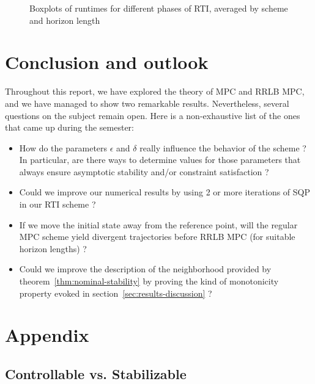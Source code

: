\documentclass[12pt]{article}
\begin{document}
\begin{itemize}[label=\textbullet]
\begin{figure}[!ht]
		\caption{Boxplots of runtimes for different phases of RTI, averaged by scheme and horizon length}
		\label{fig:runtimes}
	\end{figure}

\end{itemize}

\section{Conclusion and outlook}

Throughout this report, we have explored the theory of MPC and RRLB MPC, and we have managed to show two remarkable results.
Nevertheless, several questions on the subject remain open.
Here is a non-exhaustive list of the ones that came up during the semester:
\begin{itemize}[label=\textbullet]
	\item How do the parameters $\epsilon$ and $\delta$ really influence the behavior of the scheme ? In particular, are there ways to determine values for those parameters that always ensure asymptotic stability and/or constraint satisfaction ?

	\item Could we improve our numerical results by using 2 or more iterations of SQP in our RTI scheme ?

	\item If we move the initial state away from the reference point, will the regular MPC scheme yield divergent trajectories before RRLB MPC (for suitable horizon lengths) ?

	\item Could we improve the description of the neighborhood provided by theorem~\ref{thm:nominal-stability} by proving the kind of monotonicity property evoked in section~\ref{sec:results-discussion} ?
\end{itemize}


\newpage

\section{Appendix}

\subsection{Controllable vs. Stabilizable}\label{sec:controllability-stabilizability}
\end{document}
